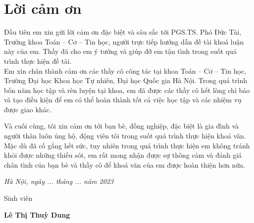 \section*{Lời cảm ơn}
\thispagestyle{empty}
\fontsize{14}{16}\selectfont
\begin{center}
\end{center}
\hspace*{1.5cm}Đầu tiên em xin gửi lời cảm ơn đặc biệt và sâu sắc tới PGS.TS. Phó Đức Tài, Trưởng
khoa Toán – Cơ – Tin học, người trực tiếp hướng dẫn đề tài khoá luận này của em.
Thầy đã cho em ý tưởng và giúp đỡ em tận tình trong suốt quá trình thực hiện đề tài. \\
\hspace*{1.5cm} Em xin chân thành cảm ơn các thầy cô công tác tại khoa Toán – Cơ – Tin học,
Trường Đại học Khoa học Tự nhiên, Đại học Quốc gia Hà Nội. Trong quá trình bốn
năm học tập và rèn luyện tại khoa, em đã được các thầy cô hết lòng chỉ bảo và tạo
điều kiện để em có thể hoàn thành tốt cả việc học tập và các nhiệm vụ được giao
khác.

Và cuối cùng, tôi xin cảm ơn tới bạn bè, đồng nghiệp, đặc biệt là gia đình và người thân luôn 
ủng hộ, động viên tôi trong suốt quá trình thực hiện khoá văn. Mặc dù đã cố gắng hết sức, tuy 
nhiên trong quá trình thực hiện em không tránh khỏi được những thiếu sót, em rất mong nhận được 
sự thông cảm và đánh giá chân tình của bạn bè và thầy cô để khoá văn của em được hoàn thiện hơn nữa.
\begin{flushright}
{\it Hà Nội, ngày ... tháng ... năm 2023}

Sinh viên\hskip 2cm\quad

\vskip 1cm
{\bf Lê Thị Thuỳ Dung} \hskip 1cm \quad\ 
 \end{flushright}


